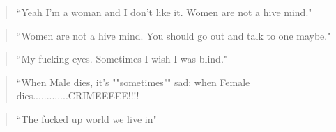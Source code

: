 \begin{quote}
``Yeah I’m a woman and I don’t like it. Women are not a hive mind."
\end{quote}

\begin{quote}
``Women are not a hive mind. You should go out and talk to one maybe."
\end{quote}

\begin{quote}
``My fucking eyes. Sometimes I wish I was blind."
\end{quote}

\begin{quote}
``When Male dies, it's ""sometimes"" sad; when Female dies.............CRIMEEEEE!!!!
\end{quote}

\begin{quote}
``The fucked up world we live in"
\end{quote}
